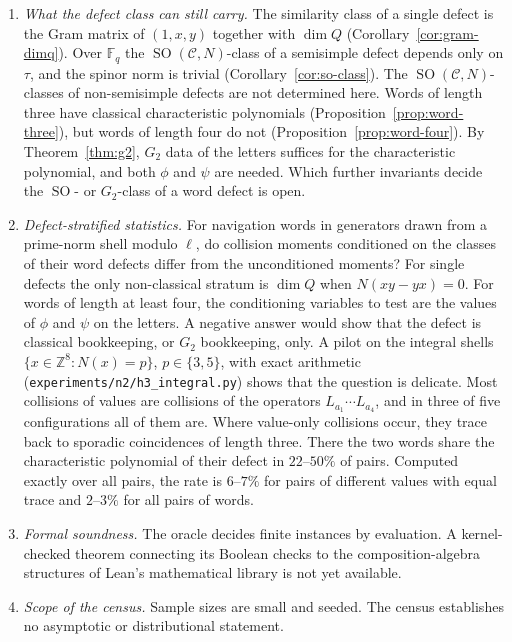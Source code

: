 \documentclass[11pt]{amsart}
\theoremstyle{definition}
\theoremstyle{remark}
\newcommand{\F}{\mathbb{F}}
\newcommand{\C}{\mathcal{C}}
\DeclareMathOperator{\SO}{SO}
\begin{document}
\begin{enumerate}[label=(\arabic*)]
\item \emph{What the defect class can still carry.} The similarity class
  of a single defect is the Gram matrix of $(1,x,y)$ together with $\dim Q$
  (Corollary~\ref{cor:gram-dimq}). Over $\F_q$ the $\SO(\C,N)$-class of a
  semisimple defect depends only on $\tau$, and the spinor norm is trivial
  (Corollary~\ref{cor:so-class}). The $\SO(\C,N)$-classes of non-semisimple
  defects are not determined here. Words of length three have classical
  characteristic polynomials (Proposition~\ref{prop:word-three}), but words
  of length four do not (Proposition~\ref{prop:word-four}).
  By Theorem~\ref{thm:g2}, $G_2$ data of the letters suffices for the
  characteristic polynomial, and both $\phi$ and $\psi$ are needed. Which
  further invariants decide the $\SO$- or $G_2$-class of a word defect is open.
\item \emph{Defect-stratified statistics.} For navigation words in generators
  drawn from a prime-norm shell modulo $\ell$, do collision moments
  conditioned on the classes of their word defects differ from the
  unconditioned moments? For single defects the only non-classical stratum
  is $\dim Q$ when $N(xy-yx)=0$. For words of length at least four, the
  conditioning variables to test are the values of $\phi$ and $\psi$ on the
  letters. A negative answer would show that the defect is classical
  bookkeeping, or $G_2$ bookkeeping, only. A pilot on the integral shells
  $\{x\in\mathbb{Z}^8:N(x)=p\}$, $p\in\{3,5\}$, with exact arithmetic
  (\texttt{experiments/n2/h3\_integral.py}) shows that the question is
  delicate. Most collisions of values are collisions of the operators
  $L_{a_1}\cdots L_{a_4}$, and in three of five configurations all of them
  are. Where value-only collisions occur, they trace back to sporadic
  coincidences of length three. There the two words share the characteristic
  polynomial of their defect in $22$--$50\%$ of pairs. Computed exactly over
  all pairs, the rate is $6$--$7\%$ for pairs of different values with equal
  trace and $2$--$3\%$ for all pairs of words.
\item \emph{Formal soundness.} The oracle decides finite instances by
  evaluation. A kernel-checked theorem connecting its Boolean checks to the
  composition-algebra structures of Lean's mathematical library is not yet
  available.
\item \emph{Scope of the census.} Sample sizes are small and seeded. The
  census establishes no asymptotic or distributional statement.
\end{enumerate}
\end{document}
